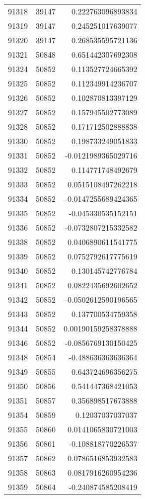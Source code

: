 \begin{tabular}{r | r | r}
91318 & 39147 & 0.222763096893834 \\
91319 & 39147 & 0.245251017639077 \\
91320 & 39147 & 0.268535595721136 \\
91321 & 50848 & 0.651442307692308 \\
91324 & 50852 & 0.113527724665392 \\
91325 & 50852 & 0.112349914236707 \\
91326 & 50852 & 0.102870813397129 \\
91327 & 50852 & 0.157945502773089 \\
91328 & 50852 & 0.171712502888838 \\
91330 & 50852 & 0.198733249051833 \\
91331 & 50852 & -0.0121989365029716 \\
91332 & 50852 & 0.114771748492679 \\
91333 & 50852 & 0.0515108497262218 \\
91334 & 50852 & -0.0147255689424365 \\
91335 & 50852 & -0.045330535152151 \\
91336 & 50852 & -0.0732807215332582 \\
91338 & 50852 & 0.0406890611541775 \\
91339 & 50852 & 0.0752792617775619 \\
91340 & 50852 & 0.130145742776784 \\
91341 & 50852 & 0.0822435692602652 \\
91342 & 50852 & -0.0502612590196565 \\
91343 & 50852 & 0.137700534759358 \\
91344 & 50852 & 0.00190159258378888 \\
91346 & 50852 & -0.0856769130150425 \\
91348 & 50854 & -0.488636363636364 \\
91349 & 50855 & 0.643724696356275 \\
91350 & 50856 & 0.541447368421053 \\
91351 & 50857 & 0.356898517673888 \\
91354 & 50859 & 0.12037037037037 \\
91355 & 50860 & 0.0141065830721003 \\
91356 & 50861 & -0.108818770226537 \\
91357 & 50862 & 0.0786516853932583 \\
91358 & 50863 & 0.0817916260954236 \\
91359 & 50864 & -0.240874585208419 \\

\end{tabular}
